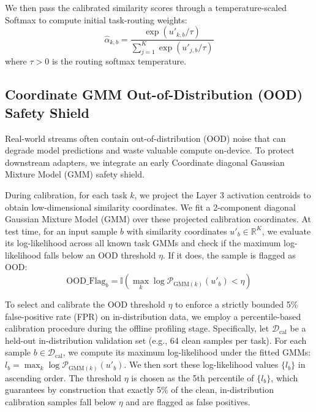We then pass the calibrated similarity scores through a temperature-scaled Softmax to compute initial task-routing weights:
\begin{equation}
\hat{\alpha}_{k, b} = \frac{\exp(u'_{k, b} / \tau)}{\sum_{j=1}^K \exp(u'_{j, b} / \tau)}
\label{eq:softmax}
\end{equation}
where $\tau > 0$ is the routing softmax temperature.

\subsection{Coordinate GMM Out-of-Distribution (OOD) Safety Shield}
Real-world streams often contain out-of-distribution (OOD) noise that can degrade model predictions and waste valuable compute on-device. To protect downstream adapters, we integrate an early Coordinate diagonal Gaussian Mixture Model (GMM) safety shield. 

During calibration, for each task $k$, we project the Layer 3 activation centroids to obtain low-dimensional similarity coordinates. We fit a 2-component diagonal Gaussian Mixture Model (GMM) over these projected calibration coordinates. At test time, for an input sample $b$ with similarity coordinates $u'_{b} \in \mathbb{R}^K$, we evaluate its log-likelihood across all known task GMMs and check if the maximum log-likelihood falls below an OOD threshold $\eta$. If it does, the sample is flagged as OOD:
\begin{equation}
\text{OOD\_Flag}_b = \mathbb{I}\left( \max_{k} \log \mathcal{P}_{\text{GMM}(k)}(u'_{b}) < \eta \right)
\label{eq:gmm_flag}
\end{equation}

To select and calibrate the OOD threshold $\eta$ to enforce a strictly bounded 5\% false-positive rate (FPR) on in-distribution data, we employ a percentile-based calibration procedure during the offline profiling stage. Specifically, let $\mathcal{D}_{\text{cal}}$ be a held-out in-distribution validation set (e.g., 64 clean samples per task). For each sample $b \in \mathcal{D}_{\text{cal}}$, we compute its maximum log-likelihood under the fitted GMMs: $l_b = \max_{k} \log \mathcal{P}_{\text{GMM}(k)}(u'_{b})$. We then sort these log-likelihood values $\{l_b\}$ in ascending order. The threshold $\eta$ is chosen as the 5th percentile of $\{l_b\}$, which guarantees by construction that exactly 5\% of the clean, in-distribution calibration samples fall below $\eta$ and are flagged as false positives.

